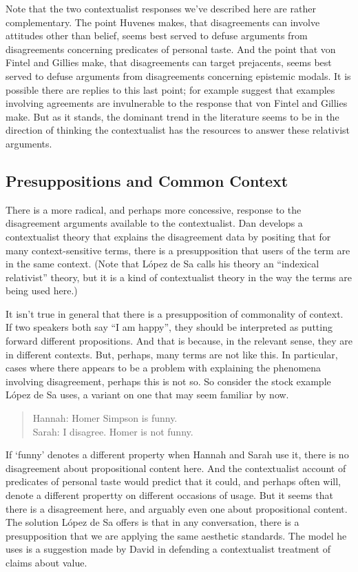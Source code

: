 Note that the two contextualist responses we've described here are rather complementary. The point Huvenes makes, that disagreements can involve attitudes other than belief, seems best served to defuse arguments from disagreements concerning predicates of personal taste. And the point that von Fintel and Gillies make, that disagreements can target prejacents, seems best served to defuse arguments from disagreements concerning epistemic modals. It is possible there are replies to this last point;  \citet{WeathersonEgan2011} for example suggest that examples involving agreements are invulnerable to the response that von Fintel and Gillies make. But as it stands, the dominant trend in the literature seems to be in the direction of thinking the contextualist has the resources to answer these relativist arguments.

\subsection{Presuppositions and Common Context}
\label{presuppositionsandcommoncontext}

There is a more radical, and perhaps more concessive, response to the disagreement arguments available to the contextualist. Dan  \citet{LopezDeSa2008b} develops a contextualist theory that explains the disagreement data by positing that for many context-sensitive terms, there is a presupposition that users of the term are in the same context. (Note that López de Sa calls his theory an ``indexical relativist'' theory, but it is a kind of contextualist theory in the way the terms are being used here.)

It isn't true in general that there is a presupposition of commonality of context. If two speakers both say ``I am happy'', they should be interpreted as putting forward different propositions. And that is because, in the relevant sense, they are in different contexts. But, perhaps, many terms are not like this. In particular, cases where there appears to be a problem with explaining the phenomena involving disagreement, perhaps this is not so. So consider the stock example López de Sa uses, a variant on one that may seem familiar by now.

\begin{quote}

Hannah: Homer Simpson is funny.\\
Sarah: I disagree. Homer is not funny.
\end{quote}
If `funny' denotes a different property when Hannah and Sarah use it, there is no disagreement about propositional content here. And the contextualist account of predicates of personal taste would predict that it could, and perhaps often will, denote a different propertty on different occasions of usage. But it seems that there is a disagreement here, and arguably even one about propositional content. The solution López de Sa offers is that in any conversation, there is a presupposition that we are applying the same aesthetic standards. The model he uses is a suggestion made by David  \citet{Lewis1989b} in defending a contextualist treatment of claims about value.

